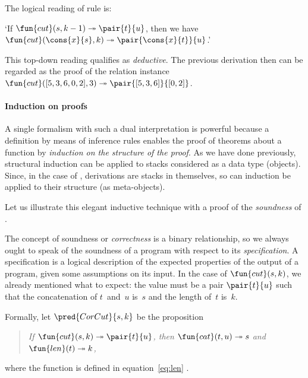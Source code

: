 The logical reading of rule  is:
\begin{center}
  `If \(\fun{cut}(s,k-1) \twoheadrightarrow \pair{t}{u}\), then we
  have \(\fun{cut}(\cons{x}{s},k) \twoheadrightarrow
  \pair{\cons{x}{t}}{u}\).'
\end{center}
This top\hyp{}down reading qualifies as
\emph{deductive}. The
previous derivation then can be regarded as the proof of the relation
instance\\
\(\fun{cut}([5,3,6,0,2],3) \twoheadrightarrow \pair{[5,3,6]}{[0,2]}\).


\paragraph{Induction on proofs}

A single formalism with such a dual interpretation is powerful because
a definition by means of inference rules enables the proof of theorems
about a function by \emph{induction on the structure of the proof}. As
we have done previously, structural induction can be applied to stacks
considered as a data type (objects). Since, in the case of
, derivations are stacks in themselves, so can induction be
applied to their structure (as meta\hyp{}objects).

Let us illustrate this elegant inductive technique with a proof of the
\emph{soundness} of
.

\label{par:cut_sound}

The concept of soundness or \emph{correctness} \citep{McCarthy_1962,
  Floyd_1967, Hoare_1971,
  Dijkstra_1976} is a binary
relationship, so we always ought to speak of the soundness of a
program with respect to its
\emph{specification}. A specification is a
logical description of the expected properties of the output of a
program, given some assumptions on its input. In the case of
\(\fun{cut}(s,k)\), we already mentioned what to expect: the value
must be a pair \(\pair{t}{u}\) such that the concatenation of
\(t\)~and~\(u\) is~\(s\) and the length of~\(t\) is~\(k\).

Formally, let \(\pred{CorCut}{s,k}\)
be the proposition
\begin{quote}
  \textsl{If \(\fun{cut}(s,k) \twoheadrightarrow \pair{t}{u}\), then
    \(\fun{cat}(t,u) \twoheadrightarrow s\) and \(\fun{len}(t)
    \twoheadrightarrow k\),}
\end{quote}
where the function  is defined in
equation~\eqref{eq:len} .

